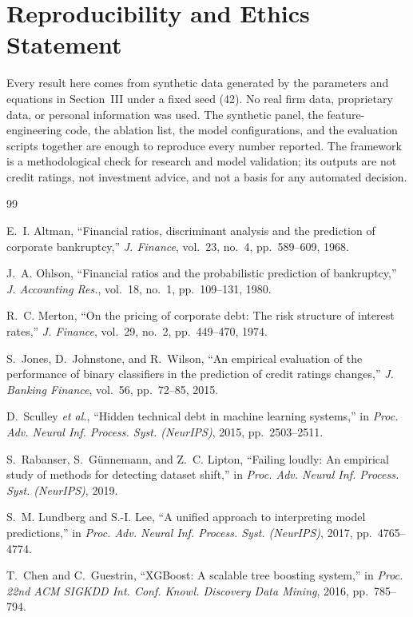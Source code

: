 \documentclass[conference]{IEEEtran}
\begin{document}
\section*{Reproducibility and Ethics Statement}
Every result here comes from synthetic data generated by the parameters and
equations in Section~III under a fixed seed (42). No real firm data, proprietary
data, or personal information was used. The synthetic panel, the
feature-engineering code, the ablation list, the model configurations, and the
evaluation scripts together are enough to reproduce every number reported. The
framework is a methodological check for research and model validation; its
outputs are not credit ratings, not investment advice, and not a basis for any
automated decision.

\begin{thebibliography}{99}

E.~I. Altman, ``Financial ratios, discriminant analysis and the prediction of
corporate bankruptcy,'' \emph{J. Finance}, vol.~23, no.~4, pp.~589--609, 1968.

J.~A. Ohlson, ``Financial ratios and the probabilistic prediction of
bankruptcy,'' \emph{J. Accounting Res.}, vol.~18, no.~1, pp.~109--131, 1980.

R.~C. Merton, ``On the pricing of corporate debt: The risk structure of interest
rates,'' \emph{J. Finance}, vol.~29, no.~2, pp.~449--470, 1974.

S.~Jones, D.~Johnstone, and R.~Wilson, ``An empirical evaluation of the
performance of binary classifiers in the prediction of credit ratings changes,''
\emph{J. Banking Finance}, vol.~56, pp.~72--85, 2015.

D.~Sculley \emph{et al.}, ``Hidden technical debt in machine learning systems,''
in \emph{Proc. Adv. Neural Inf. Process. Syst. (NeurIPS)}, 2015, pp.~2503--2511.

S.~Rabanser, S.~G\"unnemann, and Z.~C. Lipton, ``Failing loudly: An empirical
study of methods for detecting dataset shift,'' in \emph{Proc. Adv. Neural Inf.
Process. Syst. (NeurIPS)}, 2019.

S.~M. Lundberg and S.-I. Lee, ``A unified approach to interpreting model
predictions,'' in \emph{Proc. Adv. Neural Inf. Process. Syst. (NeurIPS)}, 2017,
pp.~4765--4774.

T.~Chen and C.~Guestrin, ``XGBoost: A scalable tree boosting system,'' in
\emph{Proc. 22nd ACM SIGKDD Int. Conf. Knowl. Discovery Data Mining}, 2016,
pp.~785--794.


\end{thebibliography}
\end{document}
